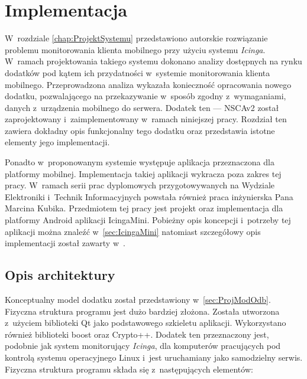 \chapter{Implementacja}
\label{chap:Implementacja}

W~rozdziale \ref{chap:ProjektSystemu} przedstawiono autorskie
rozwiązanie problemu monitorowania klienta mobilnego przy użyciu
systemu {\em Icinga}. W~ramach projektowania takiego systemu dokonano
analizy dostępnych na rynku dodatków pod kątem ich przydatności
w~systemie monitorowania klienta mobilnego. Przeprowadzona analiza
wykazała konieczność opracowania nowego dodatku, pozwalającego na
przekazywanie w~sposób zgodny z~wymaganiami, danych z~urządzenia
mobilnego do serwera.  Dodatek ten --- NSCAv2 został zaprojektowany
i~zaimplementowany w~ramach niniejszej pracy. Rozdział ten zawiera
dokładny opis funkcjonalny tego dodatku oraz przedstawia istotne
elementy jego implementacji.

Ponadto w~proponowanym systemie występuje aplikacja przeznaczona dla
platformy mobilnej. Implementacja takiej aplikacji wykracza poza
zakres tej pracy.  W~ramach serii prac dyplomowych przygotowywanych na
Wydziale Elektroniki i~Technik Informacyjnych powstała również praca
inżynierska Pana Marcina Kubika. Przedmiotem tej pracy jest projekt
oraz implementacja dla platformy Android aplikacji
IcingaMini. Pobieżny opis koncepcji i~potrzeby tej aplikacji można
znaleźć w~\ref{sec:IcingaMini} natomiast szczegółowy opis
implementacji został zawarty w~\cite{book:pracaKubika}.

\section[Opis architektury][Opis architektury]{Opis architektury}


Konceptualny model dodatku został przedstawiony
w~\ref{sec:ProjModOdb}. Fizyczna struktura programu jest dużo bardziej
złożona. Została utworzona z~użyciem biblioteki Qt jako podstawowego
szkieletu aplikacji. Wykorzystano również biblioteki boost oraz
Crypto++. Dodatek ten przeznaczony jest, podobnie jak system
monitorujący {\em Icinga}, dla komputerów pracujących pod kontrolą systemu
operacyjnego Linux i~jest uruchamiany jako samodzielny
serwis. Fizyczna struktura programu składa się z~następujących
elementów:

